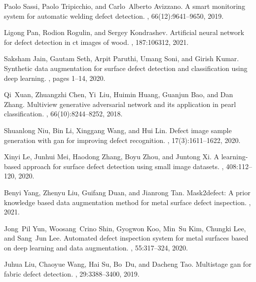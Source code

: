 \documentclass[sn-mathphys]{sn-jnl}%
\theoremstyle{thmstyleone}%
\theoremstyle{thmstyletwo}%
\theoremstyle{thmstylethree}%
\begin{document}
\begin{thebibliography}{10}
Paolo Sassi, Paolo Tripicchio, and Carlo~Alberto Avizzano.
\newblock A smart monitoring system for automatic welding defect detection.
, 66(12):9641--9650,
  2019.

Ligong Pan, Rodion Rogulin, and Sergey Kondrashev.
\newblock Artificial neural network for defect detection in ct images of wood.
, 187:106312, 2021.

Saksham Jain, Gautam Seth, Arpit Paruthi, Umang Soni, and Girish Kumar.
\newblock Synthetic data augmentation for surface defect detection and
  classification using deep learning.
, pages 1--14, 2020.

Qi~Xuan, Zhuangzhi Chen, Yi~Liu, Huimin Huang, Guanjun Bao, and Dan Zhang.
\newblock Multiview generative adversarial network and its application in pearl
  classification.
, 66(10):8244--8252,
  2018.

Shuanlong Niu, Bin Li, Xinggang Wang, and Hui Lin.
\newblock Defect image sample generation with gan for improving defect
  recognition.
,
  17(3):1611--1622, 2020.

Xinyi Le, Junhui Mei, Haodong Zhang, Boyu Zhou, and Juntong Xi.
\newblock A learning-based approach for surface defect detection using small
  image datasets.
, 408:112--120, 2020.

Benyi Yang, Zhenyu Liu, Guifang Duan, and Jianrong Tan.
\newblock Mask2defect: A prior knowledge based data augmentation method for
  metal surface defect inspection.
, 2021.

Jong~Pil Yun, Woosang~Crino Shin, Gyogwon Koo, Min~Su Kim, Chungki Lee, and
  Sang~Jun Lee.
\newblock Automated defect inspection system for metal surfaces based on deep
  learning and data augmentation.
, 55:317--324, 2020.

Juhua Liu, Chaoyue Wang, Hai Su, Bo~Du, and Dacheng Tao.
\newblock Multistage gan for fabric defect detection.
, 29:3388--3400, 2019.


\end{thebibliography}
\end{document}
